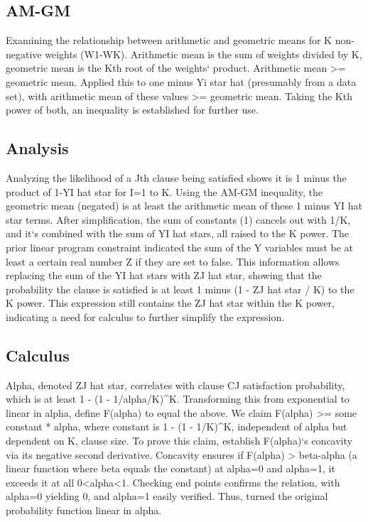 \subsection*{AM-GM}
Examining the relationship between arithmetic and geometric means for K non-negative weights (W1-WK).
Arithmetic mean is the sum of weights divided by K, geometric mean is the Kth root of the weights` product.
Arithmetic mean \textgreater{}= geometric mean.
Applied this to one minus Yi star hat (presumably from a data set), with arithmetic mean of these values \textgreater{}= geometric mean.
Taking the Kth power of both, an inequality is established for further use.

\subsection*{Analysis}
Analyzing the likelihood of a Jth clause being satisfied shows it is 1 minus the product of 1-YI hat star for I=1 to K\@.
Using the AM-GM inequality, the geometric mean (negated) is at least the arithmetic mean of these 1 minus YI hat star terms.
After simplification, the sum of constants (1) cancels out with 1/K, and it`s combined with the sum of YI hat stars, all raised to the K power.
The prior linear program constraint indicated the sum of the Y variables must be at least a certain real number Z if they are set to false.
This information allows replacing the sum of the YI hat stars with ZJ hat star, showing that the probability the clause is satisfied is at least 1 minus (1 - ZJ hat star / K) to the K power.
This expression still contains the ZJ hat star within the K power, indicating a need for calculus to further simplify the expression.

\subsection*{Calculus}
Alpha, denoted ZJ hat star, correlates with clause CJ satisfaction probability, which is at least 1 - (1 - 1/alpha/K)\textasciicircum{}K\@.
Transforming this from exponential to linear in alpha, define F(alpha) to equal the above.
We claim F(alpha) \textgreater{}= some constant * alpha, where constant is 1 - (1 - 1/K)\textasciicircum{}K, independent of alpha but dependent on K, clause size.
To prove this claim, establish F(alpha)`s concavity via its negative second derivative.
Concavity ensures if F(alpha) \textgreater{} beta-alpha (a linear function where beta equals the constant) at alpha=0 and alpha=1, it exceeds it at all 0\textless{}alpha\textless{}1.
Checking end points confirms the relation, with alpha=0 yielding 0, and alpha=1 easily verified.
Thus, turned the original probability function linear in alpha.


